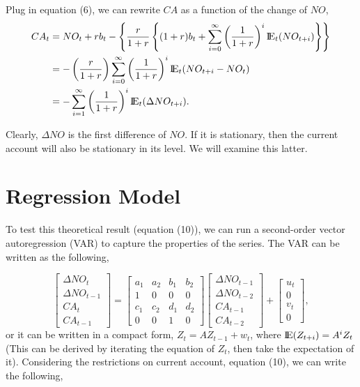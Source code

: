 \documentclass[12pt]{article}
\begin{document}
Plug in equation (6), we can rewrite $ CA $ as a function of the change of $ NO $,
\begin{align}
CA_{t} &= NO_{t} + r b_{t} - \left\{ 
\frac{r}{1 + r}\left\{ 
(1 + r)b_{t} + \sum\limits_{i = 0} ^\infty \left( \frac{1}{1 + r} \right)^{i}
{\rm I\!{E}}_{t}(NO_{t + i})
\right\} 
\right\} \\
 &=  - \left( \frac{r}{1 + r} \right) \sum\limits_{i = 0} ^\infty 
 \left( \frac{1}{1 + r} \right) ^{i}{\rm I\!{E}}_{t}(NO_{t + i} - NO_{t})\\
 &=  - \sum\limits_{i = 1} ^\infty \left( \frac{1}{1 + r} \right)^{i}{\rm I\!{E}}_{t}
 (\Delta NO_{t + i}) .
\end{align}

Clearly, $ \Delta NO $ is the first difference of $ NO $. If it is stationary, then
the current account will also be stationary in its level. We will examine this latter.


\section{Regression Model}

To test this theoretical result (equation (10)), we can run a second-order vector 
autoregression (VAR) to capture the properties of the series. The VAR can be written
as the following,

\begin{equation}
\begin{bmatrix}
\Delta NO_{t}\\
\Delta NO_{t - 1}\\
CA_{t}\\
CA_{t - 1}
\end{bmatrix}
=
\begin{bmatrix}
a_1 & a_2 & b_1 & b_2\\
1 & 0 & 0 & 0\\
c_1 & c_2 & d_1 & d_2\\
0 & 0 & 1 & 0
\end{bmatrix}
\begin{bmatrix}
\Delta NO_{t - 1}\\
\Delta NO_{t - 2}\\
CA_{t - 1}\\
CA_{t - 2}
\end{bmatrix}
 + 
\begin{bmatrix}
u_{t}\\
0\\
v_{t}\\
0
\end{bmatrix},
\end{equation}
or it can be written in a compact form, $ Z_{t} = AZ_{t - 1} + w_{t} $, where
$ {\rm I\!{E}}(Z_{t + i}) = A^{i}Z_{t} $ (This can be derived by iterating the equation
of $ Z_{t} $, then take the expectation of it). Considering the restrictions on 
current account, equation (10), we can write the following,
\end{document}
